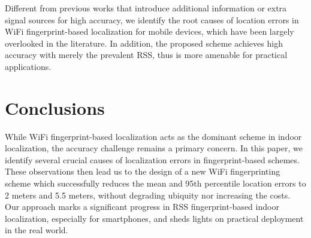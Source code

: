 \documentclass[10pt,conference,compsocconf,letterpaper]{./sty/IEEEtran}
\begin{document}
Different from previous works that introduce additional information or extra signal sources for high accuracy, we identify the root causes of location errors in WiFi fingerprint-based localization for mobile devices, which have been largely overlooked in the literature. In addition, the proposed scheme achieves high accuracy with merely the prevalent RSS, thus is more amenable for practical applications.


\section{Conclusions}
\label{sec:conclusions}

While WiFi fingerprint-based localization acts as the dominant scheme in indoor localization, the accuracy challenge remains a primary concern. In this paper, we identify several crucial causes of localization errors in fingerprint-based schemes. These observations then lead us to the design of a new WiFi fingerprinting scheme which successfully reduces the mean and 95th percentile location errors to 2 meters and 5.5 meters, without degrading  ubiquity nor increasing the costs. Our approach marks a significant progress in RSS fingerprint-based indoor localization, especially for smartphones, and sheds lights on practical deployment in the real world. 


\balance




\end{document}
